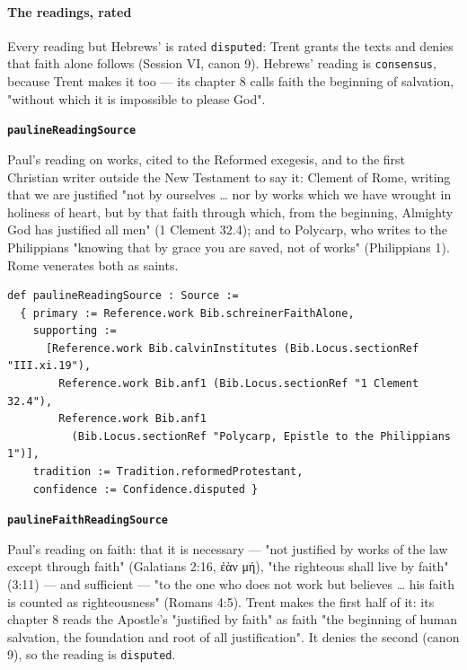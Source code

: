 \documentclass[11pt]{article}
\begin{document}
\paragraph*{The readings, rated}
\leavevmode\par
Every reading but Hebrews' is rated \texttt{disputed}: Trent grants the texts and denies that faith alone follows (Session VI, canon 9). Hebrews' reading is \texttt{consensus}, because Trent makes it too — its chapter 8 calls faith the beginning of salvation, "without which it is impossible to please God".

\par\medskip\noindent\textbf{\texttt{pauline\allowbreak{}Reading\allowbreak{}Source}}\par\nobreak\noindent
Paul's reading on works, cited to the Reformed exegesis, and to the first Christian writer outside the New Testament to say it: Clement of Rome, writing that we are justified "not by ourselves … nor by works which we have wrought in holiness of heart, but by that faith through which, from the beginning, Almighty God has justified all men" (1 Clement 32.4); and to Polycarp, who writes to the Philippians "knowing that by grace you are saved, not of works" (Philippians 1). Rome venerates both as saints.

{\small\begin{verbatim}
def paulineReadingSource : Source :=
  { primary := Reference.work Bib.schreinerFaithAlone,
    supporting :=
      [Reference.work Bib.calvinInstitutes (Bib.Locus.sectionRef "III.xi.19"),
        Reference.work Bib.anf1 (Bib.Locus.sectionRef "1 Clement 32.4"),
        Reference.work Bib.anf1
          (Bib.Locus.sectionRef "Polycarp, Epistle to the Philippians 1")],
    tradition := Tradition.reformedProtestant,
    confidence := Confidence.disputed }
\end{verbatim}}
\par\medskip\noindent\textbf{\texttt{pauline\allowbreak{}Faith\allowbreak{}Reading\allowbreak{}Source}}\par\nobreak\noindent
Paul's reading on faith: that it is necessary — "not justified by works of the law except through faith" (Galatians 2:16, ἐὰν μή), "the righteous shall live by faith" (3:11) — and sufficient — "to the one who does not work but believes … his faith is counted as righteousness" (Romans 4:5). Trent makes the first half of it: its chapter 8 reads the Apostle's "justified by faith" as faith "the beginning of human salvation, the foundation and root of all justification". It denies the second (canon 9), so the reading is \texttt{disputed}.
\end{document}
